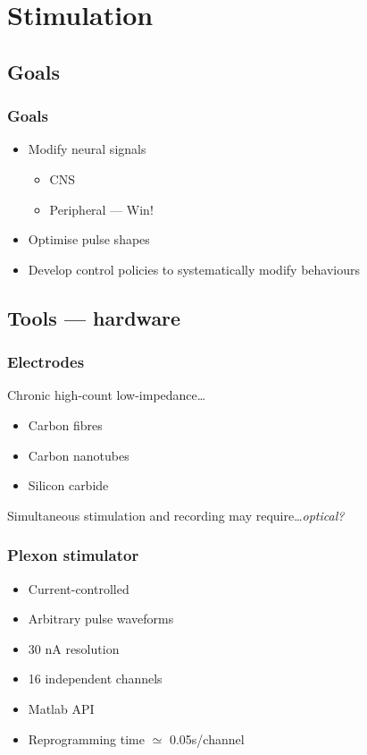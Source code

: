\documentclass{beamer}
\begin{document}
\section{Stimulation}
\subsection{Goals}

\begin{frame}
  \frametitle{Goals}
  \begin{itemize}
  \item Modify neural signals
    \begin{itemize}
    \item CNS
    \item Peripheral --- Win!
    \end{itemize}
  \item Optimise pulse shapes
  \item Develop control policies to systematically modify behaviours
  \end{itemize}
\end{frame}


\subsection{Tools --- hardware}

\begin{frame}
  \frametitle{Electrodes}
  Chronic high-count low-impedance\dots
  \begin{itemize}
    \item Carbon fibres
    \item Carbon nanotubes
    \item Silicon carbide
  \end{itemize}
  Simultaneous stimulation and recording may require\dots {\em optical?}
\end{frame}

\begin{frame}
  \frametitle{Plexon stimulator}
  \begin{itemize}
    \item Current-controlled
    \item Arbitrary pulse waveforms
    \item 30 nA resolution
    \item 16 independent channels
    \item Matlab API
    \item Reprogramming time $\simeq$ 0.05s/channel
  \end{itemize}
\end{frame}
    
\end{document}
